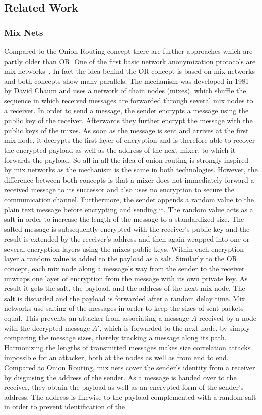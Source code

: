 \documentclass{sig-alternate}
\begin{document}
\subsection {Related Work}
 \subsubsection {Mix Nets}
Compared to the Onion Routing concept there are further approaches which are partly older than OR. One of the first basic network anonymization protocols are mix networks~\cite{chaum1981untraceable}. In fact the idea behind the OR concept is based on mix networks and both concepts show many parallels. The mechanism was developed in 1981 by David Chaum and uses a network of chain nodes (mixes), which shuffle the sequence in which received messages are forwarded through several mix nodes to a receiver. In order to send a message, the sender encrypts a message using the public key of the receiver. Afterwards they further encrypt the message with the public keys of the mixes. As soon as the message is sent and arrives at the first mix node, it decrypts the first layer of encryption and is therefore able to recover the encrypted payload as well as the address of the next mixer, to which it forwards the payload. So all in all the idea of onion routing is strongly inspired by mix networks as the mechanism is the same in both technologies. However, the difference between both concepts is that a mixer does not immediately forward a received message to its successor and also uses no encryption to secure the communication channel. Furthermore, the sender appends a random value to the plain text message before encrypting and sending it. The random value acts as a salt in order to increase the length of the message to a standardized size. The salted message is subsequently encrypted with the receiver's public key and the result is extended by the receiver's address and then again wrapped into one or several encryption layers using the mixes public keys. Within each encryption layer a random value is added to the payload as a salt. Similarly to the OR concept, each mix node along a message's way from the sender to the receiver unwraps one layer of encryption from the message with its own private key. As result it gets the salt, the payload, and the address of the next mix node. The salt is discarded and the payload is forwarded after a random delay time. Mix networks use salting of the messages in order to keep the sizes of sent packets equal. This prevents an attacker from associating a message $A$ received by a node with the decrypted message $ A' $, which is forwarded to the next node, by simply comparing the message sizes, thereby tracking a message along its path. Harmonizing the lengths of transmitted messages makes size correlation attacks impossible for an attacker, both at the nodes as well as from end to end. Compared to Onion Routing, mix nets cover the sender's identity from a receiver by disguising the address of the sender. As a message is handed over to the receiver, they obtain the payload as well as an encrypted form of the sender's address. The address is likewise to the payload complemented with a random salt in order to prevent identification of the 
\end{document}
